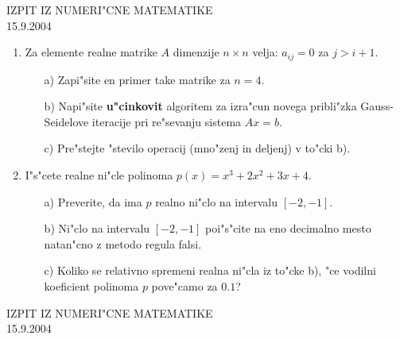 
\large
\begin{center}
  {\Large IZPIT IZ NUMERI"CNE MATEMATIKE\\
        15.9.2004
    }
\end{center}
\vspace{1.5cm}
\begin{enumerate}
        \item Za elemente realne matrike $A$ dimenzije $n\times n$ 
          velja: $a_{ij}=0$ za $j>i+1$.
          \begin{itemize}
            \item[a)] Zapi"site en primer take matrike za $n=4$.
            \item[b)] Napi"site {\bf u"cinkovit} algoritem za 
              izra"cun novega pribli"zka Gauss-Seidelove iteracije pri re"sevanju 
	      sistema $A x = b$.
            \item[c)] Pre"stejte "stevilo operacij (mno"zenj in deljenj)
              v to"cki b).
          \end{itemize} 
        \item I"s"cete realne ni"cle polinoma $p(x)=x^3+2x^2+3x+4$.
        \begin{itemize}
                \item[a)] Preverite, da ima $p$ realno ni"clo na
                  intervalu $[-2,-1]$.
                \item[b)] Ni"clo na intervalu $[-2,-1]$ poi"s"cite na
                  eno decimalno mesto na\-tan\-"cno z metodo regula falsi.
                \item[c)] Koliko se relativno spremeni realna ni"cla
                  iz to"cke b), "ce vodilni koeficient polinoma $p$
                  pove"camo za $0.1$?
        \end{itemize} 
\end{enumerate}
\newpage
\begin{center}
  {\Large IZPIT IZ NUMERI"CNE MATEMATIKE\\
        15.9.2004
    }
\end{center}
\vspace{1.5cm}

